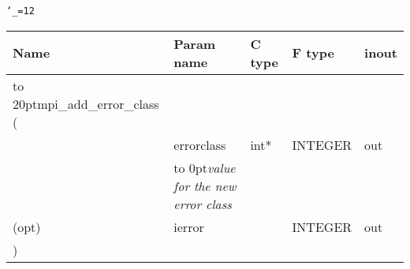 \begingroup\tt\catcode`\_=12
\begin{tabular}{lllll}
\toprule
\textrm{Name}&\textrm{Param name}&\textrm{C type}&\textrm{F type}&\textrm{inout}\\
\midrule
\hbox to 20pt{mpi_add_error_class (\hss} \\
&errorclass&int*&INTEGER&out\\ [-3pt]
&\hbox to 0pt{\footnotesize\sl value for the new error class\hss}\\
(opt)&ierror&&INTEGER&out\\
)\\
\bottomrule
\end{tabular}
\endgroup

